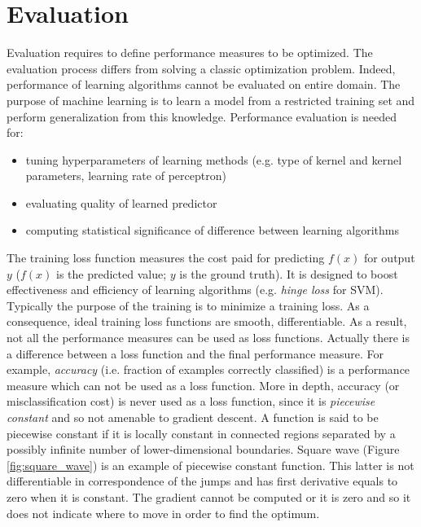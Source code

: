 \chapter{Evaluation}
\label{cha:evaluation} Evaluation requires to define performance measures to be optimized.
The evaluation process differs from solving a classic optimization problem. Indeed,
performance of learning algorithms cannot be evaluated on entire domain. The purpose
of machine learning is to learn a model from a restricted training set and perform
generalization from this knowledge. Performance evaluation is needed for:
\begin{itemize}
	\item tuning hyperparameters of learning methods (e.g. type of kernel and kernel
		parameters, learning rate of perceptron)

	\item evaluating quality of learned predictor

	\item computing statistical significance of difference between learning algorithms
\end{itemize}

The training loss function measures the cost paid for predicting $f(x)$ for
output $y$ ($f(x)$ is the predicted value; $y$ is the ground truth). It is
designed to boost effectiveness and efficiency of learning algorithms (e.g.
\textit{hinge loss} for SVM). Typically the purpose of the training is to minimize
a training loss. As a consequence, ideal training loss functions are smooth,
differentiable. As a result, not all the performance measures can be used as
loss functions. Actually there is a difference between a loss function and the final
performance measure. For example, \textit{accuracy} (i.e. fraction of examples
correctly classified) is a performance measure which can not be used as a loss function.
More in depth, accuracy (or misclassification cost) is never used as a loss function,
since it is \textit{piecewise constant} and so not amenable to gradient descent.
A function is said to be piecewise constant if it is locally constant in
connected regions separated by a possibly infinite number of lower-dimensional
boundaries. Square wave (Figure \ref{fig:square_wave}) is an example of piecewise
constant function. This latter is not differentiable in correspondence of the
jumps and has first derivative equals to zero when it is constant. The gradient cannot
be computed or it is zero and so it does not indicate where to move in order to find
the optimum.

